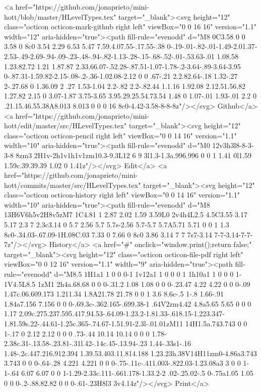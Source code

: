       <a href="https://github.com/jonaprieto/mini-hott/blob/master/HLevelTypes.tex" target="_blank"><svg height="12" class="octicon octicon-mark-github right left" viewBox="0 0 16 16" version="1.1" width="12" aria-hidden="true"><path fill-rule="evenodd" d="M8 0C3.58 0 0 3.58 0 8c0 3.54 2.29 6.53 5.47 7.59.4.07.55-.17.55-.38 0-.19-.01-.82-.01-1.49-2.01.37-2.53-.49-2.69-.94-.09-.23-.48-.94-.82-1.13-.28-.15-.68-.52-.01-.53.63-.01 1.08.58 1.23.82.72 1.21 1.87.87 2.33.66.07-.52.28-.87.51-1.07-1.78-.2-3.64-.89-3.64-3.95 0-.87.31-1.59.82-2.15-.08-.2-.36-1.02.08-2.12 0 0 .67-.21 2.2.82.64-.18 1.32-.27 2-.27.68 0 1.36.09 2 .27 1.53-1.04 2.2-.82 2.2-.82.44 1.1.16 1.92.08 2.12.51.56.82 1.27.82 2.15 0 3.07-1.87 3.75-3.65 3.95.29.25.54.73.54 1.48 0 1.07-.01 1.93-.01 2.2 0 .21.15.46.55.38A8.013 8.013 0 0 0 16 8c0-4.42-3.58-8-8-8z"/></svg> Github</a>
      <a href="https://github.com/jonaprieto/mini-hott/edit/master/src/HLevelTypes.tex" target="_blank"><svg height="12" class="octicon octicon-pencil right left" viewBox="0 0 14 16" version="1.1" width="10" aria-hidden="true"><path fill-rule="evenodd" d="M0 12v3h3l8-8-3-3-8 8zm3 2H1v-2h1v1h1v1zm10.3-9.3L12 6 9 3l1.3-1.3a.996.996 0 0 1 1.41 0l1.59 1.59c.39.39.39 1.02 0 1.41z"/></svg> Edit</a>
      <a href="https://github.com/jonaprieto/mini-hott/commits/master/src/HLevelTypes.tex" target="_blank"><svg height="12" class="octicon octicon-history right left" viewBox="0 0 14 16" version="1.1" width="10" aria-hidden="true"><path fill-rule="evenodd" d="M8 13H6V6h5v2H8v5zM7 1C4.81 1 2.87 2.02 1.59 3.59L0 2v4h4L2.5 4.5C3.55 3.17 5.17 2.3 7 2.3c3.14 0 5.7 2.56 5.7 5.7s-2.56 5.7-5.7 5.7A5.71 5.71 0 0 1 1.3 8c0-.34.03-.67.09-1H.08C.03 7.33 0 7.66 0 8c0 3.86 3.14 7 7 7s7-3.14 7-7-3.14-7-7-7z"/></svg> History</a>
      <a  href="#" onclick="window.print();return false;" target="_blank"><svg height="12" class="octicon octicon-file-pdf right left" viewBox="0 0 12 16" version="1.1" width="9" aria-hidden="true"><path fill-rule="evenodd" d="M8.5 1H1a1 1 0 0 0-1 1v12a1 1 0 0 0 1 1h10a1 1 0 0 0 1-1V4.5L8.5 1zM1 2h4a.68.68 0 0 0-.31.2 1.08 1.08 0 0 0-.23.47 4.22 4.22 0 0 0-.09 1.47c.06.609.173 1.211.34 1.8A21.78 21.78 0 0 1 3.6 8.6c-.5 1-.8 1.66-.91 1.84a7.156 7.156 0 0 0-.69.3c-.362.165-.699.38-1 .64V2zm4.42 4.8a5.65 5.65 0 0 0 1.17 2.09c.275.237.595.417.94.53-.64.09-1.23.2-1.81.33-.618.15-1.223.347-1.81.59s.22-.44.61-1.25c.365-.74.67-1.51.91-2.3l-.01.01zM11 14H1.5a.743.743 0 0 1-.17 0 2.12 2.12 0 0 0 .73-.44 10.14 10.14 0 0 0 1.78-2.38c.31-.13.58-.23.81-.31l.42-.14c.45-.13.94-.23 1.44-.33s1-.16 1.48-.2c.447.216.912.394 1.39.53.403.11.814.188 1.23.23h.38V14H11zm0-4.86a3.743 3.743 0 0 0-.64-.28 4.221 4.221 0 0 0-.75-.11c-.411.003-.822.03-1.23.08a3 3 0 0 1-1-.64 6.07 6.07 0 0 1-1.29-2.33c.111-.661.178-1.33.2-2 .02-.25.02-.5 0-.75a1.05 1.05 0 0 0-.2-.88.82.82 0 0 0-.61-.23H8l3 3v4.14z"/></svg> Print</a>
